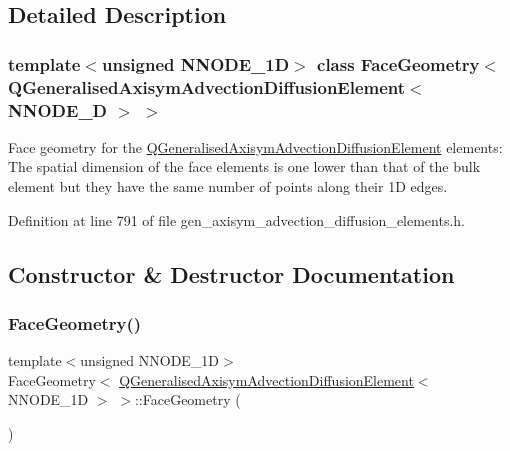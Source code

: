 \subsection{Detailed Description}
\subsubsection*{template$<$unsigned N\+N\+O\+D\+E\+\_\+1D$>$\newline
class Face\+Geometry$<$ Q\+Generalised\+Axisym\+Advection\+Diffusion\+Element$<$ N\+N\+O\+D\+E\+\_\+D $>$ $>$}

Face geometry for the \hyperlink{classQGeneralisedAxisymAdvectionDiffusionElement}{Q\+Generalised\+Axisym\+Advection\+Diffusion\+Element} elements\+: The spatial dimension of the face elements is one lower than that of the bulk element but they have the same number of points along their 1D edges. 

Definition at line 791 of file gen\+\_\+axisym\+\_\+advection\+\_\+diffusion\+\_\+elements.\+h.



\subsection{Constructor \& Destructor Documentation}
\mbox{\label{classFaceGeometry_3_01QGeneralisedAxisymAdvectionDiffusionElement_3_01NNODE__1D_01_4_01_4_aea6b844788ae63f199b4fb1e0b6d976c}} 
\subsubsection{\texorpdfstring{Face\+Geometry()}{FaceGeometry()}}
{\footnotesize\ttfamily template$<$unsigned N\+N\+O\+D\+E\+\_\+1D$>$ \\
Face\+Geometry$<$ \hyperlink{classQGeneralisedAxisymAdvectionDiffusionElement}{Q\+Generalised\+Axisym\+Advection\+Diffusion\+Element}$<$ N\+N\+O\+D\+E\+\_\+1D $>$ $>$\+::Face\+Geometry (\begin{DoxyParamCaption}{ }\end{DoxyParamCaption})\hspace{0.3cm}{\ttfamily [inline]}}



